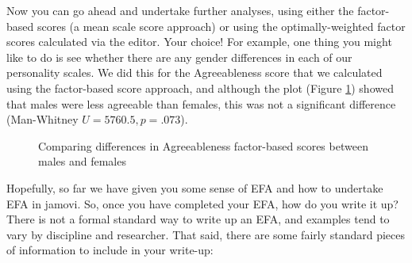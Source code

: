Now you can go ahead and undertake further analyses, using either the factor-based scores (a mean scale score approach) or using the optimally-weighted factor scores calculated via the  editor. Your choice! For example, one thing you might like to do is see whether there are any gender differences in each of our personality scales. We did this for the Agreeableness score that we calculated using the factor-based score approach, and although the plot (Figure \ref{fig:fa12}) showed that males were less agreeable than females, this was not a significant difference (Man-Whitney $U=5760.5, p=.073$).

\begin{figure}[!htb]
\begin{center}
\caption{Comparing differences in Agreeableness factor-based scores between males and females}
\label{fig:fa12}
\HR
\end{center}
\end{figure}



Hopefully, so far we have given you some sense of EFA and how to undertake EFA in jamovi. So, once you have completed your EFA, how do you write it up? There is not a formal standard way to write up an EFA, and examples tend to vary by discipline and researcher. That said, there are some fairly standard pieces of information to include in your write-up: 

